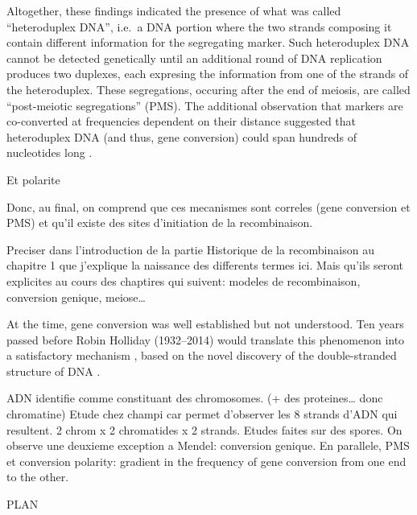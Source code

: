 Altogether, these findings indicated the presence of what was called “heteroduplex DNA”, i.e.\ a DNA portion where the two strands composing it contain different information for the segregating marker.
Such heteroduplex DNA cannot be detected genetically until an additional round of DNA replication produces two duplexes, each expresing the information from one of the strands of the heteroduplex.
These segregations, occuring after the end of meiosis, are called “post-meiotic segregations” (PMS).
The additional observation that markers are co-converted at frequencies dependent on their distance suggested that heteroduplex DNA (and thus, gene conversion) could span hundreds of nucleotides long \citep{orr1985fungal}.






Et polarite



Donc, au final, on comprend que ces mecanismes sont correles (gene conversion et PMS) et qu'il existe des sites d'initiation de la recombinaison. 

Preciser dans l'introduction de la partie Historique de la recombinaison au chapitre 1 que j'explique la naissance des differents termes ici. Mais qu'ils seront explicites au cours des chaptires qui suivent: modeles de recombinaison, conversion genique, meiose…



At the time, gene conversion was well established but not understood. Ten years passed before Robin Holliday (1932--2014) would translate this phenomenon into a satisfactory mechanism \citep{holliday1964mechanism}, based on the novel discovery of the double-stranded structure of DNA \citep{franklin1953molecular,watson1953molecular}. 






ADN identifie comme constituant des chromosomes. (+ des proteines… donc chromatine)
Etude chez champi car permet d'observer les 8 strands d'ADN qui resultent. 2 chrom x 2 chromatides x 2 strands.
Etudes faites sur des spores. 
On observe une deuxieme exception a Mendel: conversion genique.
En parallele, PMS
et conversion polarity: gradient in the frequency of gene conversion from one end to the other.










PLAN\:


